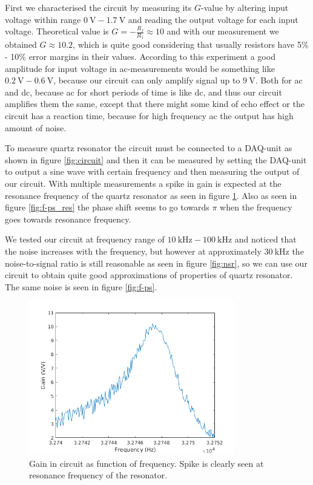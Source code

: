 \documentclass[12pt]{article}
\begin{document}
First we characterised the circuit by measuring its $G$-value by altering input voltage within range $\SI{0}{\volt} - \SI{1.7}{\volt}$ and reading the output voltage for each input voltage. Theoretical value is $G = -\frac{R_f}{R_1} \approx 10$ and with our measurement we obtained $G \approx 10.2$, which is quite good considering that usually resistors have 5\% - 10\% error margins in their values. According to this experiment a good amplitude for input voltage in ac-measurements would be something like $\SI{0.2}{\volt} - \SI{0.6}{\volt}$, because our circuit can only amplify signal up to $\SI{9}{\volt}$. Both for ac and dc, because ac for short periods of time is like dc, and thus our circuit amplifies them the same, except that there might some kind of echo effect or the circuit has a reaction time, because for high frequency ac the output has high amount of noise.

To measure quartz resonator the circuit must be connected to a DAQ-unit as shown in figure \ref{fig:circuit} and then it can be measured by setting the DAQ-unit to output a sine wave with certain frequency and then measuring the output of our circuit. With multiple measurements a spike in gain is expected at the resonance frequency of the quartz resonator as seen in figure \ref{fig:f-g}. Also as seen in figure \ref{fig:f-ps_res} the phase shift seems to go towards $\pi$ when the frequency goes towards resonance frequency.

We tested our circuit at frequency range of $\SI{10}{\kilo\hertz} - \SI{100}{\kilo\hertz}$ and noticed that the noise increases with the frequency, but however at approximately $\SI{30}{\kilo\hertz}$ the noise-to-signal ratio is still reasonable as seen in figure \ref{fig:nsr}, so we can use our circuit to obtain quite good approximations of properties of quartz resonator. The same noise is seen in figure \ref{fig:f-ps}.

\begin{figure}[!ht]
\centering
\includegraphics[width = 0.8\textwidth]{kuvat/f-g.png}
\caption{Gain in circuit as function of frequency. Spike is clearly seen at resonance frequency of the resonator.}
\label{fig:f-g}
\end{figure}
\end{document}
